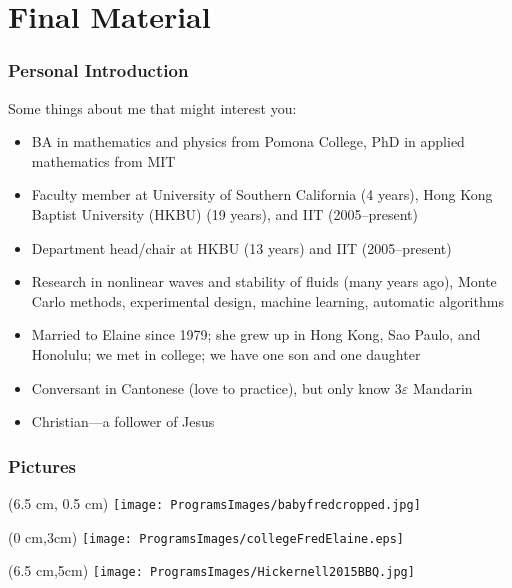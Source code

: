 \documentclass[10pt,compress,xcolor={usenames,dvipsnames},CJK]{beamer}
\begin{document}
\section{Final Material}

\begin{frame}
\frametitle{Personal Introduction}
\begin{CJK}{UTF8}{bsmi}
Some things about me that might interest you:
\begin{itemize}

\item BA in mathematics and physics from Pomona College, PhD in applied mathematics from MIT

\item Faculty member at University of Southern California (4 years), Hong Kong Baptist University (HKBU) (19 years), and IIT (2005--present)

\item Department head/chair at HKBU (13 years) and IIT (2005--present)

\item Research in nonlinear waves and stability of fluids (many years ago), Monte Carlo methods, experimental design, machine learning, automatic algorithms

\item Married to Elaine since 1979; she grew up in Hong Kong, Sao Paulo, and Honolulu; we met in college; we have one son and one daughter

\item Conversant in Cantonese (love to practice), but only know $3\varepsilon$ Mandarin

\item Christian---a follower of Jesus

\end{itemize}
\end{CJK}
\end{frame}

\begin{frame}
\frametitle{Pictures}
\begin{textblock*}{6.5cm}(6.5 cm, 0.5 cm)
\texttt{[image: ProgramsImages/babyfredcropped.jpg]}
\end{textblock*}
\begin{textblock*}{6.5cm}(0 cm,3cm)
	\texttt{[image: ProgramsImages/collegeFredElaine.eps]}
\end{textblock*}
\begin{textblock*}{6.5cm}(6.5 cm,5cm)
	\texttt{[image: ProgramsImages/Hickernell2015BBQ.jpg]}
\end{textblock*}
\end{frame}
\end{document}
